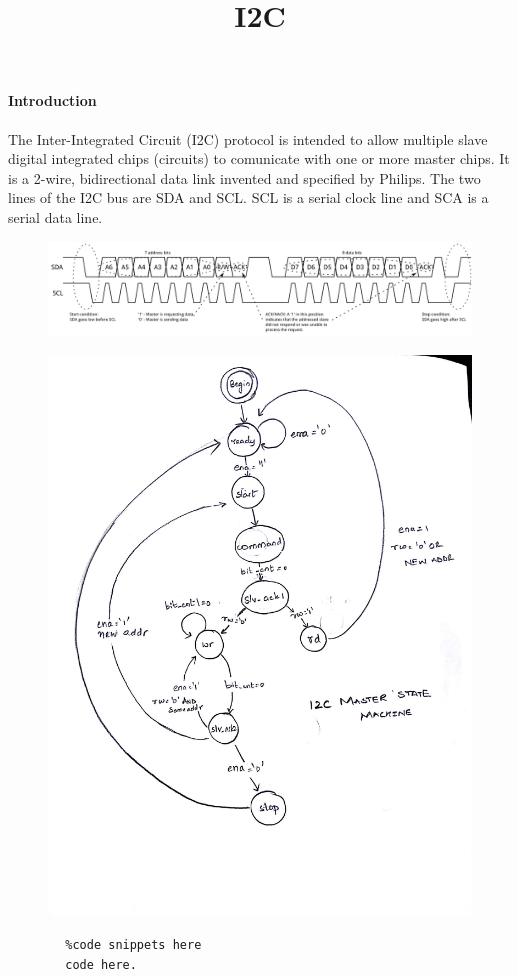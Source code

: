 \documentclass[journal,12pt,twocolumn]{IEEEtran}
\title{I2C}
\begin{document}
	\maketitle

	\paragraph{Introduction}
		The Inter-Integrated Circuit (I2C) protocol is intended to allow multiple slave digital integrated chips (circuits) to comunicate with one or more master chips. It is a 2-wire, bidirectional data link invented and specified by Philips. The two lines of the I2C bus are SDA and SCL. SCL is a serial clock line and SCA is a serial data line. 

		

	\begin{figure}[h!] %
		\includegraphics[width=\linnewidth]{i2c_concept.png}
		\label{fig: I2C protocol}
	\end{figure}

	\begin{figure}[p] %
		\includegraphics[width=\linewidth]{i2c_state_diagram.JPG}
	\end{figure}


	\begin{lstlisting}
		%code snippets here
		code here. 
	\end{lstlisting}
\end{document}
